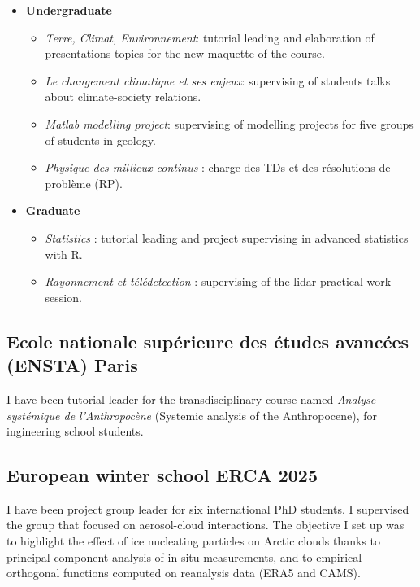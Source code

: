     \begin{itemize}
        \item[] \textbf{Undergraduate}
        \begin{itemize}
            \item \textit{Terre, Climat, Environnement}: tutorial leading and elaboration of presentations topics for the new maquette of the course.
        \end{itemize}
        \begin{itemize}
            \item \textit{Le changement climatique et ses enjeux}: supervising of students talks about climate-society relations.
        \end{itemize}
        \begin{itemize}
            \item \textit{Matlab modelling project}: supervising of modelling projects for five groups of students in geology.
            \item \textit{Physique des millieux continus} : charge des TDs et des résolutions de problème (RP).
        \end{itemize}
        \item[] \textbf{Graduate}
        \begin{itemize}
            \item \textit{Statistics} : tutorial leading and project supervising in advanced statistics with R.
            \item \textit{Rayonnement et télédetection} : supervising of the lidar practical work session.
        \end{itemize}
    \end{itemize}

    \subsection*{Ecole nationale supérieure des études avancées (ENSTA) Paris}
    I have been tutorial leader for the transdisciplinary course named \textit{Analyse systémique de l'Anthropocène} (Systemic analysis of the Anthropocene), for ingineering school students.

    \subsection*{European winter school ERCA 2025}
    I have been project group leader for six international PhD students. I supervised the group that focused on aerosol-cloud interactions. 
    The objective I set up was to highlight the effect of ice nucleating particles on Arctic clouds thanks to principal component analysis of in situ measurements, and to empirical orthogonal functions computed on reanalysis data (ERA5 and CAMS).

